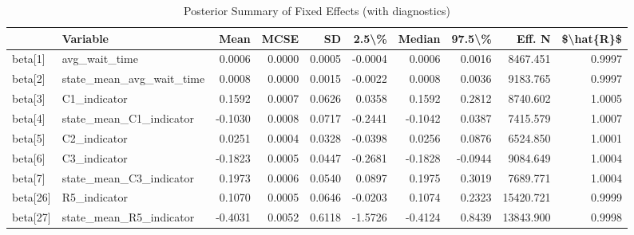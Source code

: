 \begin{table}

\caption{Posterior Summary of Fixed Effects (with diagnostics)}
\centering
\begin{tabular}[t]{llrrrrrrrr}
\toprule
  & Variable & Mean & MCSE & SD & 2.5\textbackslash{}\% & Median & 97.5\textbackslash{}\% & Eff. N & \$\textbackslash{}hat\{R\}\$\\
\midrule
beta[1] & avg\_wait\_time & 0.0006 & 0.0000 & 0.0005 & -0.0004 & 0.0006 & 0.0016 & 8467.451 & 0.9997\\
beta[2] & state\_mean\_avg\_wait\_time & 0.0008 & 0.0000 & 0.0015 & -0.0022 & 0.0008 & 0.0036 & 9183.765 & 0.9997\\
beta[3] & C1\_indicator & 0.1592 & 0.0007 & 0.0626 & 0.0358 & 0.1592 & 0.2812 & 8740.602 & 1.0005\\
beta[4] & state\_mean\_C1\_indicator & -0.1030 & 0.0008 & 0.0717 & -0.2441 & -0.1042 & 0.0387 & 7415.579 & 1.0007\\
beta[5] & C2\_indicator & 0.0251 & 0.0004 & 0.0328 & -0.0398 & 0.0256 & 0.0876 & 6524.850 & 1.0001\\
\addlinespace
beta[6] & C3\_indicator & -0.1823 & 0.0005 & 0.0447 & -0.2681 & -0.1828 & -0.0944 & 9084.649 & 1.0004\\
beta[7] & state\_mean\_C3\_indicator & 0.1973 & 0.0006 & 0.0540 & 0.0897 & 0.1975 & 0.3019 & 7689.771 & 1.0004\\
beta[26] & R5\_indicator & 0.1070 & 0.0005 & 0.0646 & -0.0203 & 0.1074 & 0.2323 & 15420.721 & 0.9999\\
beta[27] & state\_mean\_R5\_indicator & -0.4031 & 0.0052 & 0.6118 & -1.5726 & -0.4124 & 0.8439 & 13843.900 & 0.9998\\
\bottomrule
\end{tabular}
\end{table}
